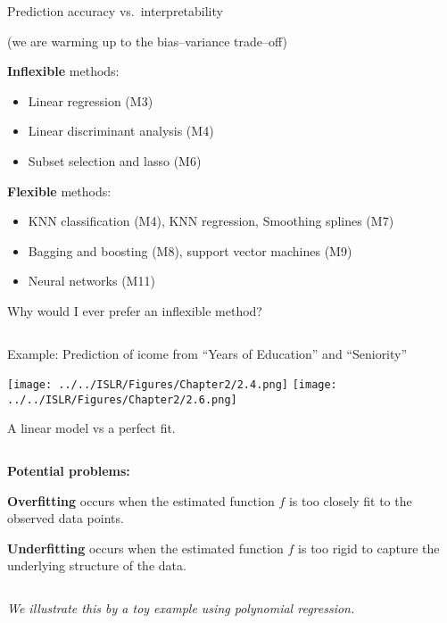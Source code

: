 \documentclass[ignorenonframetext,]{beamer}
\providecommand{\tightlist}{%
  \setlength{\itemsep}{0pt}\setlength{\parskip}{0pt}}
\begin{document}
\begin{frame}{Prediction accuracy vs.~interpretability}
\protect\hypertarget{prediction-accuracy-vs.interpretability}{}

(we are warming up to the bias--variance trade--off)

\textbf{Inflexible} methods:

\begin{itemize}
\tightlist
\item
  Linear regression (M3)
\item
  Linear discriminant analysis (M4)
\item
  Subset selection and lasso (M6)
\end{itemize}

\textbf{Flexible} methods:

\begin{itemize}
\tightlist
\item
  KNN classification (M4), KNN regression, Smoothing splines (M7)
\item
  Bagging and boosting (M8), support vector machines (M9)
\item
  Neural networks (M11)
\end{itemize}

\end{frame}

\begin{frame}

\begin{block}{Why would I ever prefer an inflexible method?}

\(~\)

Example: Prediction of icome from ``Years of Education'' and
``Seniority''\vspace{2mm}

\centering

\texttt{[image: ../../ISLR/Figures/Chapter2/2.4.png]}
\texttt{[image: ../../ISLR/Figures/Chapter2/2.6.png]}

A linear model vs a perfect fit.

\end{block}

\end{frame}

\begin{frame}

\(~\)

\textbf{Potential problems:}

\textbf{Overfitting} occurs when the estimated function \(f\) is too
closely fit to the observed data points.

\textbf{Underfitting} occurs when the estimated function \(f\) is too
rigid to capture the underlying structure of the data.

\(~\)

\emph{We illustrate this by a toy example using polynomial regression.}

\end{frame}
\end{document}
